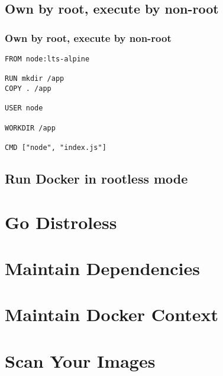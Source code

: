 \documentclass[10pt, compress]{beamer}
\begin{document}
\subsection{Own by root, execute by non-root}

\begin{frame}[fragile]
  \frametitle{Own by root, execute by non-root}
  
  \begin{verbatim}
FROM node:lts-alpine

RUN mkdir /app
COPY . /app

USER node

WORKDIR /app

CMD ["node", "index.js"]
  \end{verbatim}

\end{frame}

\subsection{Run Docker in rootless mode}


\section{Go Distroless}

\section{Maintain Dependencies}

\section{Maintain Docker Context}

\section{Scan Your Images}

\end{document}
